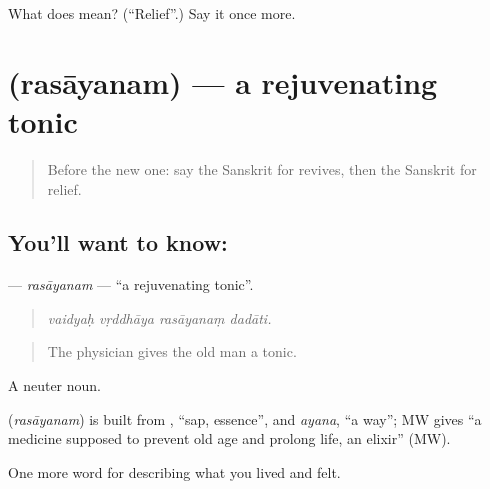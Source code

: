 \begin{tcolorbox}[breakable,colback=teal!4,colframe=teal!35!black,title={Before you move on}]
What does  mean? (\textquotedblleft{}Relief\textquotedblright{}.) Say it once more.
\end{tcolorbox}
\section[\texorpdfstring{\sk{रसायनम्} (rasāyanam)}{रसायनम् (rasāyanam)}]{ (rasāyanam) — a rejuvenating tonic}

\label{lesson:SA-C485-rasayanam}



\begin{quote}
Before the new one: say the Sanskrit for revives, then the Sanskrit for relief.
\end{quote}

\subsection*{You'll want to know: }
\textbf{} — \emph{rasāyanam} — \textquotedblleft{}a rejuvenating tonic\textquotedblright{}.

\begin{quote}
   
\end{quote}

\begin{quote}
\emph{vaidyaḥ vṛddhāya rasāyanaṃ dadāti.}
\end{quote}

\begin{quote}
The physician gives the old man a tonic.
\end{quote}

A neuter noun.

\begin{cousinweb}
\textbf{} (\emph{rasāyanam}) is built from \textbf{}, \textquotedblleft{}sap, essence\textquotedblright{}, and \emph{ayana}, \textquotedblleft{}a way\textquotedblright{}; MW gives \textquotedblleft{}a medicine supposed to prevent old age and prolong life, an elixir\textquotedblright{} (MW).
\end{cousinweb}

\begin{grammarlens}[title={What you've built}]
One more word for describing what you lived and felt.
\end{grammarlens}

